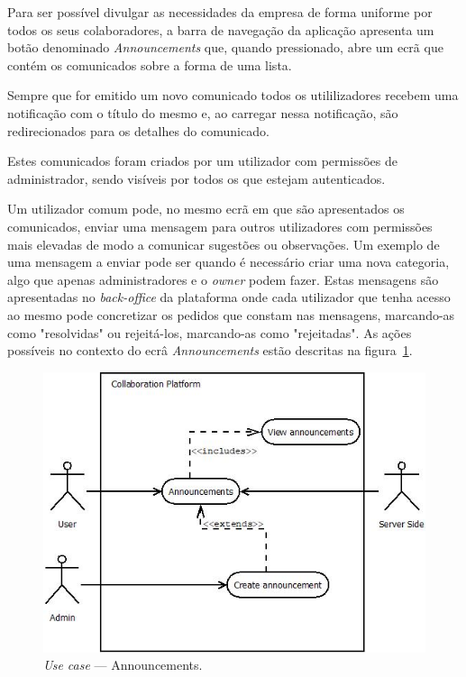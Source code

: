 Para ser possível divulgar as necessidades da empresa de forma uniforme por todos os seus colaboradores, a barra de navegação da aplicação apresenta
um botão denominado \textit{Announcements} que, quando pressionado, abre um ecrã que contém os comunicados sobre a forma de uma lista. 
\par
Sempre que for emitido um novo comunicado todos os utililizadores recebem uma notificação com o título do mesmo e, ao carregar nessa notificação, são redirecionados para os detalhes do comunicado. 
\par
Estes comunicados foram criados por um utilizador com permissões de administrador, sendo visíveis por todos os que estejam autenticados.
\par
Um utilizador comum pode, no mesmo ecrã em que são apresentados os comunicados, enviar uma mensagem para outros utilizadores com permissões mais elevadas de modo a comunicar sugestões ou observações. 
Um exemplo de uma mensagem a enviar pode ser quando é necessário criar uma nova categoria, algo que apenas administradores e o \textit{owner} podem fazer.
Estas mensagens são apresentadas no \textit{back-office} da plataforma onde cada utilizador que tenha acesso ao mesmo pode concretizar os pedidos que constam nas mensagens, marcando-as como "resolvidas" ou rejeitá-los, marcando-as como "rejeitadas".
As ações possíveis no contexto do ecrâ \textit{Announcements} estão descritas na figura~\ref{fig:uc:announcements}.

\begin{figure}[H]
    \centering
    \includegraphics[scale=0.6]{figures/Announcements use case.jpeg}
    \caption{\textit{Use case} --- Announcements.}\label{fig:uc:announcements}
\end{figure}

